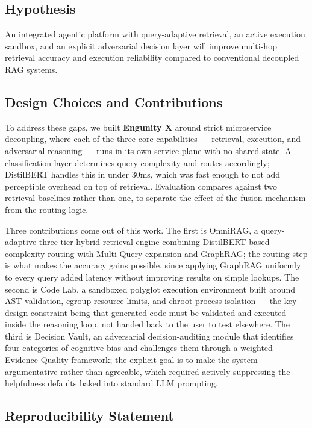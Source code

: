 \documentclass[conference]{IEEEtran}
\begin{document}
\subsection{Hypothesis}

An integrated agentic platform with query-adaptive retrieval, an active execution sandbox, and an explicit adversarial decision layer will improve multi-hop retrieval accuracy and execution reliability compared to conventional decoupled RAG systems.

\subsection{Design Choices and Contributions}

To address these gaps, we built \textbf{Engunity X} around strict microservice decoupling, where each of the three core capabilities --- retrieval, execution, and adversarial reasoning --- runs in its own service plane with no shared state. A classification layer determines query complexity and routes accordingly; DistilBERT handles this in under 30ms, which was fast enough to not add perceptible overhead on top of retrieval. Evaluation compares against two retrieval baselines rather than one, to separate the effect of the fusion mechanism from the routing logic.

Three contributions come out of this work. The first is OmniRAG, a query-adaptive three-tier hybrid retrieval engine combining DistilBERT-based complexity routing with Multi-Query expansion and GraphRAG; the routing step is what makes the accuracy gains possible, since applying GraphRAG uniformly to every query added latency without improving results on simple lookups. The second is Code Lab, a sandboxed polyglot execution environment built around AST validation, cgroup resource limits, and chroot process isolation --- the key design constraint being that generated code must be validated and executed inside the reasoning loop, not handed back to the user to test elsewhere. The third is Decision Vault, an adversarial decision-auditing module that identifies four categories of cognitive bias and challenges them through a weighted Evidence Quality framework; the explicit goal is to make the system argumentative rather than agreeable, which required actively suppressing the helpfulness defaults baked into standard LLM prompting.

\subsection{Reproducibility Statement}
\end{document}
